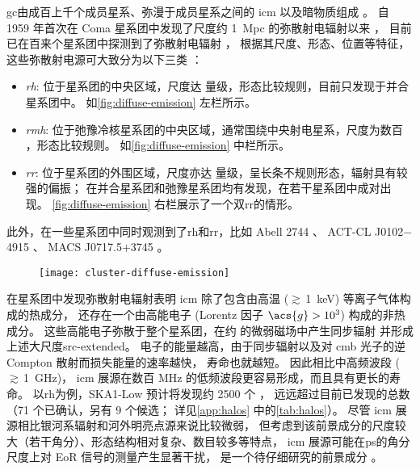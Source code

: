 \ac{gc}由成百上千个成员星系、弥漫于成员星系之间的 \ac{icm} 以及暗物质组成
\cite{sarazin1986,bohringer2010}。
自 1959 年首次在 Coma 星系团中发现了尺度约 \SI{1}{Mpc} 的弥散射电辐射以来
\cite{large1959}，
目前已在百来个星系团中探测到了弥散射电辐射 \cite{feretti2012,vanWeeren2019}，
根据其尺度、形态、位置等特征，这些弥散射电源可大致分为以下三类
\cite{feretti2012,kale2016}：
\begin{itemize}
  \item \emph{\acf{rh}}:
    位于星系团的中央区域，尺度达 \si{\Mpc} 量级，形态比较规则，目前只发现于并合星系团中。
    如\autoref{fig:diffuse-emission} 左栏所示。
  \item \emph{\acf{rmh}}:
    位于弛豫冷核星系团的中央区域，通常围绕中央射电星系，尺度为数百 \si{\kpc}，形态比较规则。
    如\autoref{fig:diffuse-emission} 中栏所示。
  \item \emph{\acf{rr}}:
    位于星系团的外围区域，尺度亦达 \si{\Mpc} 量级，呈长条不规则形态，辐射具有较强的偏振；
    在并合星系团和弛豫星系团均有发现，在若干星系团中成对出现。
    \autoref{fig:diffuse-emission} 右栏展示了一个双\ac{rr}的情形。
\end{itemize}
此外，在一些星系团中同时观测到了\ac{rh}和\ac{rr}，比如
Abell 2744 \cite{govoni2001}、
ACT-CL J0102$-$4915 \cite{lindner2014}、
MACS J0717.5$+$3745 \cite{vanWeeren2009}。

\begin{figure}[htp]
  \centering
  \texttt{[image: cluster-diffuse-emission]}
  \label{fig:diffuse-emission}
\end{figure}

在星系团中发现弥散射电辐射表明
\ac{icm} 除了包含由高温 ($\gtrsim$\,\SI{1}{\keV}) 等离子气体构成的热成分，
还存在一个由高能电子 (Lorentz 因子 $\acs{g} > \num{e3}$) 构成的非热成分。
这些高能电子弥散于整个星系团，在约 \si{\uG} 的微弱磁场中产生同步辐射
并形成上述大尺度\ac{src-extended}。
电子的能量越高，由于同步辐射以及对 \ac{cmb} 光子的逆 Compton 散射而损失能量的速率越快，
寿命也就越短。
因此相比中高频波段 ($\gtrsim$\,\SI{1}{\GHz})，
\ac{icm} 展源在数百 MHz 的低频波段更容易形成，而且具有更长的寿命。
以\ac{rh}为例，SKA1-Low 预计将发现约 2500 个 \cite{cassano2015}，
远远超过目前已发现的总数（71 个已确认，另有 9 个候选；
详见\autoref{app:halos} 中的\autoref{tab:halos}）。
尽管 \ac{icm} 展源相比银河系辐射和河外明亮点源来说比较微弱，
但考虑到该前景成分的尺度较大（若干角分）、形态结构相对复杂、数目较多等特点，
\ac{icm} 展源可能在\ac{ps}的角分尺度上对 EoR 信号的测量产生显著干扰，
是一个待仔细研究的前景成分 \cite{diMatteo2004,gleser2008}。

